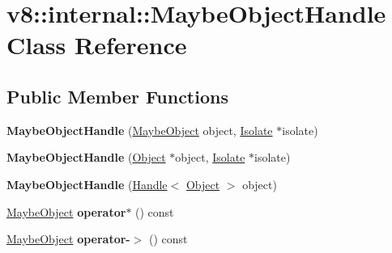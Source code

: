 \hypertarget{classv8_1_1internal_1_1MaybeObjectHandle}{}\section{v8\+:\+:internal\+:\+:Maybe\+Object\+Handle Class Reference}
\label{classv8_1_1internal_1_1MaybeObjectHandle}
\subsection*{Public Member Functions}
\begin{DoxyCompactItemize}
\item 
\mbox{\label{classv8_1_1internal_1_1MaybeObjectHandle_a4e3a19de996efd2edaccc8cc8b27f0c1}} 
{\bfseries Maybe\+Object\+Handle} (\mbox{\hyperlink{classv8_1_1internal_1_1MaybeObject}{Maybe\+Object}} object, \mbox{\hyperlink{classv8_1_1internal_1_1Isolate}{Isolate}} $\ast$isolate)
\item 
\mbox{\label{classv8_1_1internal_1_1MaybeObjectHandle_a3817c2fbad5c9b2fc712efe1c556293f}} 
{\bfseries Maybe\+Object\+Handle} (\mbox{\hyperlink{classv8_1_1internal_1_1Object}{Object}} $\ast$object, \mbox{\hyperlink{classv8_1_1internal_1_1Isolate}{Isolate}} $\ast$isolate)
\item 
\mbox{\label{classv8_1_1internal_1_1MaybeObjectHandle_a0310a293fbfebb8ffb61eb2bb4c2b828}} 
{\bfseries Maybe\+Object\+Handle} (\mbox{\hyperlink{classv8_1_1internal_1_1Handle}{Handle}}$<$ \mbox{\hyperlink{classv8_1_1internal_1_1Object}{Object}} $>$ object)
\item 
\mbox{\label{classv8_1_1internal_1_1MaybeObjectHandle_ad81bd672ea2e66da0facd01993ac886f}} 
\mbox{\hyperlink{classv8_1_1internal_1_1MaybeObject}{Maybe\+Object}} {\bfseries operator$\ast$} () const
\item 
\mbox{\label{classv8_1_1internal_1_1MaybeObjectHandle_a4797cef42a48d35303ef074f67691357}} 
\mbox{\hyperlink{classv8_1_1internal_1_1MaybeObject}{Maybe\+Object}} {\bfseries operator-\/$>$} () const
\item 

\end{DoxyCompactItemize}
